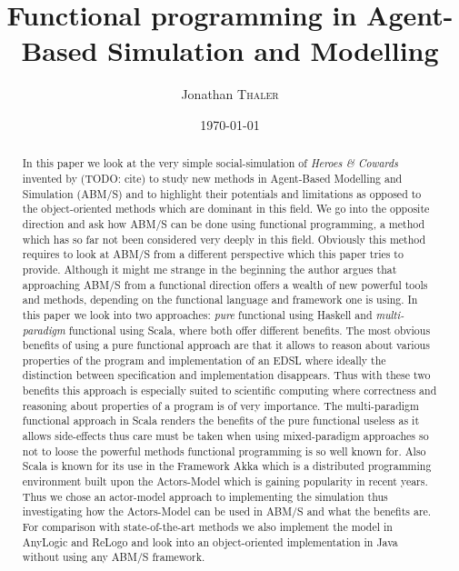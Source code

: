 \documentclass{article}
\title{Functional programming in Agent-Based Simulation and Modelling} %
\author{Jonathan \textsc{Thaler}} %
\date{\today} %
\begin{document}
\maketitle %

\begin{abstract}
In this paper we look at the very simple social-simulation of \textit{Heroes \& Cowards} invented by (TODO: cite) to study new methods in Agent-Based Modelling and Simulation (ABM/S) and to highlight their potentials and limitations as opposed to the object-oriented methods which are dominant in this field. We go into the opposite direction and ask how ABM/S can be done using functional programming, a method which has so far not been considered very deeply in this field. Obviously this method requires to look at ABM/S from a different perspective which this paper tries to provide. Although it might me strange in the beginning the author argues that approaching ABM/S from a functional direction offers a wealth of new powerful tools and methods, depending on the functional language and framework one is using. In this paper we look into two approaches: \textit{pure} functional using Haskell and \textit{multi-paradigm} functional using Scala, where both offer different benefits. The most obvious benefits of using a pure functional approach are that it allows to reason about various properties of the program and implementation of an EDSL where ideally the distinction between specification and implementation disappears. Thus with these two benefits this approach is especially suited to scientific computing where correctness and reasoning about properties of a program is of very importance. The multi-paradigm functional approach in Scala renders the benefits of the pure functional useless as it allows side-effects thus care must be taken when using mixed-paradigm approaches so not to loose the powerful methods functional programming is so well known for. Also Scala is known for its use in the Framework Akka which is a distributed programming environment built upon the Actors-Model which is gaining popularity in recent years. Thus we chose an actor-model approach to implementing the simulation thus investigating how the Actors-Model can be used in ABM/S and what the benefits are. For comparison with state-of-the-art methods we also implement the model in AnyLogic and ReLogo and look into an object-oriented implementation in Java without using any ABM/S framework.
\end{abstract}











\newpage



\end{document}
